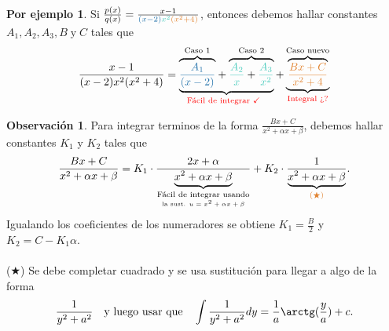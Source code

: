 \documentclass{article}
\theoremstyle{definition}
\newtheorem*{obs}{Observación}
\newtheorem*{ej}{Por ejemplo}
\theoremstyle{remark}
\newcommand\ok{\checkmark}
\begin{document}
\begin{ej}
  Si $\frac{p(x)}{q(x)}=\frac{x-1}{\textcolor{azulp2}{(x-2)}\textcolor{verdep2}{x^2}\textcolor{rojop2}{(x^2+4)}}$, entonces debemos hallar constantes $A_1, A_2, A_3, B \; \text{y} \; C$ tales que \[
\frac{x-1}{(x-2)x^2(x^2+4)}=
\underbrace{
{
\overbrace{
\textcolor{azulp2}{\frac{A_1}{(x-2)}}}^{\text{Caso 1}}
}+
\overbrace{\textcolor{verdep2}{\frac{A_2}{x}}
+
\textcolor{verdep2}{\frac{A_3}{x^2}}}^{\text{Caso 2}}}
_{\text{\textcolor{red}{Fácil de integrar $\ok$ }
}
}
+
\underbrace{
\overbrace{\textcolor{rojop2}{
\frac{Bx+C}{x^2+4}}}^{\text{Caso nuevo}}
}
_{\textcolor{red}{\text{Integral ¿?}
}
}
  \]
\end{ej}

\begin{obs}
Para integrar terminos de la forma $\frac{Bx+C}{x^2+\alpha x + \beta}$, debemos hallar constantes $K_1$ y $K_2$ tales que
\[
\frac{Bx+C}{x^2+\alpha x + \beta}
=
K_1 \cdot \frac{2x+\alpha}{\underbrace{x^2+\alpha x + \beta}_{\underset{\text{la sust. $u=x^2+\alpha x + \beta $}}{\text{Fácil de integrar usando}}}}
+
K_2 \cdot \frac{1}{\underbrace{x^2+\alpha x + \beta}_{\textcolor{rojop2}{(\bigstar)}}}.
\]
Igualando los coeficientes de los numeradores se obtiene $K_1=\frac{B}{2}$ y\\ $K_2=C-K_1 \alpha$. \\\\
\textcolor{rojop2}{($\bigstar$)} Se debe completar cuadrado y se usa sustitución para llegar a algo de la forma \[
\frac{1}{y^2+a^2} \quad \text{y luego usar que}\quad \int{\frac{1}{y^2+a^2}dy}=\frac{1}{a}\arctg(\frac{y}{a})+c.
\]
\end{obs}
\end{document}
